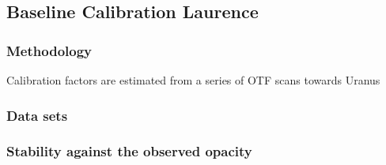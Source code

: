 \subsection{Baseline Calibration {\color{blue} Laurence} }

\subsubsection{Methodology}
Calibration factors are estimated from a series of OTF scans towards Uranus

\subsubsection{Data sets}


\subsubsection{Stability against the observed opacity}

